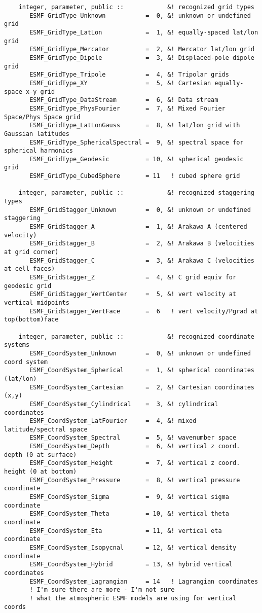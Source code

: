 \begin{verbatim} 
    integer, parameter, public ::            &! recognized grid types
       ESMF_GridType_Unknown           =  0, &! unknown or undefined grid
       ESMF_GridType_LatLon            =  1, &! equally-spaced lat/lon grid
       ESMF_GridType_Mercator          =  2, &! Mercator lat/lon grid
       ESMF_GridType_Dipole            =  3, &! Displaced-pole dipole grid
       ESMF_GridType_Tripole           =  4, &! Tripolar grids
       ESMF_GridType_XY                =  5, &! Cartesian equally-space x-y grid
       ESMF_GridType_DataStream        =  6, &! Data stream
       ESMF_GridType_PhysFourier       =  7, &! Mixed Fourier Space/Phys Space grid
       ESMF_GridType_LatLonGauss       =  8, &! lat/lon grid with Gaussian latitudes
       ESMF_GridType_SphericalSpectral =  9, &! spectral space for spherical harmonics
       ESMF_GridType_Geodesic          = 10, &! spherical geodesic grid
       ESMF_GridType_CubedSphere       = 11   ! cubed sphere grid
 
    integer, parameter, public ::            &! recognized staggering types
       ESMF_GridStagger_Unknown        =  0, &! unknown or undefined staggering
       ESMF_GridStagger_A              =  1, &! Arakawa A (centered velocity)
       ESMF_GridStagger_B              =  2, &! Arakawa B (velocities at grid corner)
       ESMF_GridStagger_C              =  3, &! Arakawa C (velocities at cell faces)
       ESMF_GridStagger_Z              =  4, &! C grid equiv for geodesic grid
       ESMF_GridStagger_VertCenter     =  5, &! vert velocity at vertical midpoints
       ESMF_GridStagger_VertFace       =  6   ! vert velocity/Pgrad at top(bottom)face
 
    integer, parameter, public ::            &! recognized coordinate systems
       ESMF_CoordSystem_Unknown        =  0, &! unknown or undefined coord system
       ESMF_CoordSystem_Spherical      =  1, &! spherical coordinates (lat/lon)
       ESMF_CoordSystem_Cartesian      =  2, &! Cartesian coordinates (x,y)
       ESMF_CoordSystem_Cylindrical    =  3, &! cylindrical coordinates
       ESMF_CoordSystem_LatFourier     =  4, &! mixed latitude/spectral space
       ESMF_CoordSystem_Spectral       =  5, &! wavenumber space
       ESMF_CoordSystem_Depth          =  6, &! vertical z coord. depth (0 at surface)
       ESMF_CoordSystem_Height         =  7, &! vertical z coord. height (0 at bottom)
       ESMF_CoordSystem_Pressure       =  8, &! vertical pressure coordinate
       ESMF_CoordSystem_Sigma          =  9, &! vertical sigma coordinate
       ESMF_CoordSystem_Theta          = 10, &! vertical theta coordinate
       ESMF_CoordSystem_Eta            = 11, &! vertical eta coordinate
       ESMF_CoordSystem_Isopycnal      = 12, &! vertical density coordinate
       ESMF_CoordSystem_Hybrid         = 13, &! hybrid vertical coordinates
       ESMF_CoordSystem_Lagrangian     = 14   ! Lagrangian coordinates
       ! I'm sure there are more - I'm not sure
       ! what the atmospheric ESMF models are using for vertical coords
 

\end{verbatim}
